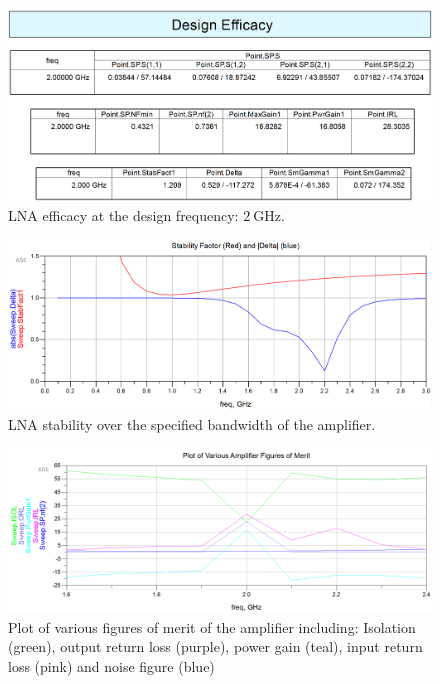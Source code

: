 \begin{figure}[H]
    \centering
    \includegraphics[width=0.8\linewidth]{Images/A2P2LNADesignFrequencyEfficacy.png}
    \caption{LNA efficacy at the design frequency: $\SI{2}{\giga\hertz}$.}
    \label{fig:A2P2LNADesignFrequencyEfficacy}
\end{figure}

\begin{figure}[H]
    \centering
    \includegraphics[width=0.8\linewidth]{Images/A2P2LNAFrequencySweepStability.png}
    \caption{LNA stability over the specified bandwidth of the amplifier.}
    \label{fig:A2P2LNAFrequencySweepStability}
\end{figure}

\begin{figure}[H]
    \centering
    \includegraphics[width=0.8\linewidth]{Images/A2P2LNAFOM.png}
    \caption{Plot of various figures of merit of the amplifier including:
    Isolation (green), output return loss (purple), power gain (teal), input
return loss (pink) and noise figure (blue)}
    \label{fig:A2P2LNAFOM}
\end{figure}

